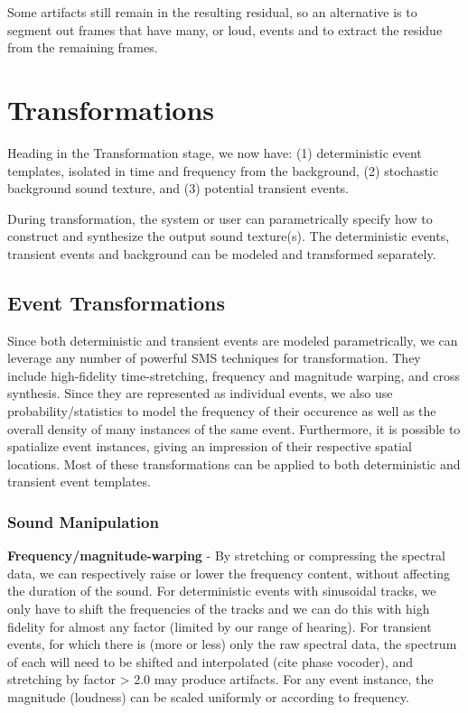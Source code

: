 \documentclass{acmsiggraph}               %
\begin{document}
Some artifacts still remain in the resulting residual, so an alternative 
is to segment out frames that have many, or loud, events and to extract 
the residue from the remaining frames.


\section{Transformations}

Heading in the Transformation stage, we now have: (1) deterministic event 
templates, isolated in time and frequency from the 
background, (2) stochastic background sound texture, and (3) potential 
transient events.

During transformation, the system or user can parametrically specify how to 
construct and synthesize the output sound texture(s).  The deterministic 
events, transient events and background can be modeled and transformed 
separately.

\subsection{Event Transformations}

Since both deterministic and transient events are modeled parametrically, we can leverage 
any number of powerful SMS techniques for transformation.  They 
include high-fidelity time-stretching, frequency and magnitude warping, 
and cross synthesis. 
Since they are represented as individual events, we also use 
probability/statistics to model the frequency of their occurence as 
well as the overall density of many instances of the same event.  
Furthermore, it is possible to spatialize event instances, giving
an impression of their respective spatial locations.  Most of these 
transformations can be applied to both deterministic and 
transient event templates.


\subsubsection{Sound Manipulation}

\textbf{Frequency/magnitude-warping} - By stretching or compressing the spectral
data, we can respectively raise or lower the frequency content, without 
affecting the duration of the sound.  For deterministic events with 
sinusoidal tracks, we only have to shift the frequencies of the tracks 
and we can do this with high fidelity for almost any factor (limited by 
our range of hearing).  For transient events, for which there is (more or 
less) only the raw spectral data, the spectrum of each will need to be 
shifted and interpolated (cite phase vocoder), and stretching by factor > 
2.0 may produce artifacts.  For any event instance, the magnitude 
(loudness) can be scaled uniformly or according to frequency.
\end{document}
